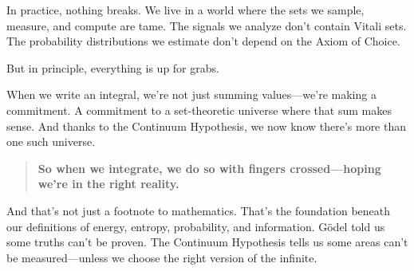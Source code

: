 In practice, nothing breaks. We live in a world where the sets we sample, measure, and compute are tame. The signals we analyze don’t contain Vitali sets. The probability distributions we estimate don’t depend on the Axiom of Choice.

But in principle, everything is up for grabs.

When we write an integral, we’re not just summing values—we’re making a commitment. A commitment to a set-theoretic universe where that sum makes sense. And thanks to the Continuum Hypothesis, we now know there’s more than one such universe.

\begin{quote}
\textbf{So when we integrate, we do so with fingers crossed—hoping we’re in the right reality.}
\end{quote}

And that’s not just a footnote to mathematics. That’s the foundation beneath our definitions of energy, entropy, probability, and information. Gödel told us some truths can’t be proven. The Continuum Hypothesis tells us some areas can’t be measured—unless we choose the right version of the infinite.


